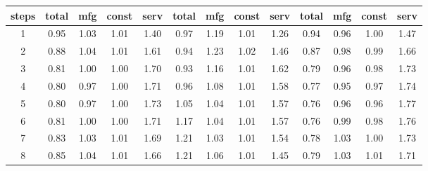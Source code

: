 \documentclass[11pt]{article}
\begin{document}
\begin{appendices}
\begin{table}[!htbp]
\begin{tabular}{c|cccc|cccc|cccc}
    \midrule
    steps & total & mfg   & const & serv  & total & mfg   & const & serv  & total & mfg   & const & serv \\
    \midrule
    1     & 0.95  & 1.03  & 1.01  & 1.40  & 0.97  & 1.19  & 1.01  & 1.26  & 0.94  & 0.96  & 1.00  & 1.47 \\
    2     & 0.88  & 1.04  & 1.01  & 1.61  & 0.94  & 1.23  & 1.02  & 1.46  & 0.87  & 0.98  & 0.99  & 1.66 \\
    3     & 0.81  & 1.00  & 1.00  & 1.70  & 0.93  & 1.16  & 1.01  & 1.62  & 0.79  & 0.96  & 0.98  & 1.73 \\
    4     & 0.80  & 0.97  & 1.00  & 1.71  & 0.96  & 1.08  & 1.01  & 1.58  & 0.77  & 0.95  & 0.97  & 1.74 \\
    5     & 0.80  & 0.97  & 1.00  & 1.73  & 1.05  & 1.04  & 1.01  & 1.57  & 0.76  & 0.96  & 0.96  & 1.77 \\
    6     & 0.81  & 1.00  & 1.00  & 1.71  & 1.17  & 1.04  & 1.01  & 1.57  & 0.76  & 0.99  & 0.98  & 1.76 \\
    7     & 0.83  & 1.03  & 1.01  & 1.69  & 1.21  & 1.03  & 1.01  & 1.54  & 0.78  & 1.03  & 1.00  & 1.73 \\
    8     & 0.85  & 1.04  & 1.01  & 1.66  & 1.21  & 1.06  & 1.01  & 1.45  & 0.79  & 1.03  & 1.01  & 1.71 \\
    \bottomrule
    \end{tabular}%
  \label{uncondp}%
\end{table}%



\end{appendices}
\end{document}
